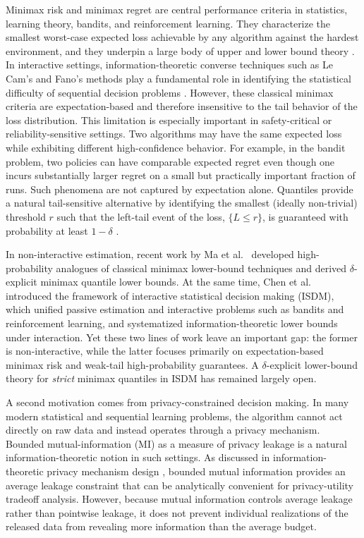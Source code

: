 \documentclass[journal]{IEEEtran}
\begin{document}
Minimax risk and minimax regret are central performance criteria in statistics, learning theory, bandits, and reinforcement learning. They characterize the smallest worst-case expected loss achievable by any algorithm against the hardest environment, and they underpin a large body of upper and lower bound theory \cite{ma2024high,audibert2009minimax,azar2017minimax,jin2018q,lattimore2020bandit,foster2021statistical}. In interactive settings, information-theoretic converse techniques such as Le Cam's and Fano's methods play a fundamental role in identifying the statistical difficulty of sequential decision problems \cite{lecam1973convergence,polyanskiy2014lecture,cover1999elements,yu1997assouad,chen2016bayes,duchi2013distance,chen2024assouad}. However, these classical minimax criteria are expectation-based and therefore insensitive to the tail behavior of the loss distribution. This limitation is especially important in safety-critical or reliability-sensitive settings. Two algorithms may have the same expected loss while exhibiting different high-confidence behavior. For example, in the bandit problem, two policies can have comparable expected regret even though one incurs substantially larger regret on a small but practically important fraction of runs. Such phenomena are not captured by expectation alone. Quantiles provide a natural tail-sensitive alternative by identifying the smallest (ideally non-trivial) threshold $r$ such that the left-tail event of the loss, \(\{L\le r\}\), is guaranteed with probability at least $1-\delta$ \cite{ma2024high}.

In non-interactive estimation, recent work by Ma et al.\ \cite{ma2024high} developed high-probability analogues of classical minimax lower-bound techniques and derived \(\delta\)-explicit minimax quantile lower bounds. At the same time, Chen et al.\ \cite{chen2024assouad} introduced the framework of interactive statistical decision making (ISDM), which unified passive estimation and interactive problems such as bandits and reinforcement learning, and systematized information-theoretic lower bounds under interaction. Yet these two lines of work leave an important gap: the former is non-interactive, while the latter focuses primarily on expectation-based minimax risk and weak-tail high-probability guarantees. A \(\delta\)-explicit lower-bound theory for \emph{strict} minimax quantiles in ISDM has remained largely open.

A second motivation comes from privacy-constrained decision making. In many modern statistical and sequential learning problems, the algorithm cannot act directly on raw data and instead operates through a privacy mechanism. Bounded mutual-information (MI) as a measure of privacy leakage is a natural information-theoretic notion in such settings. As discussed in information-theoretic privacy mechanism design
\cite{zamani2023privacy,zamani2022bounds}, bounded mutual information
provides an average leakage constraint that can be analytically convenient for
privacy-utility tradeoff analysis. However, because mutual information controls
average leakage rather than pointwise leakage, it does not prevent individual
realizations of the released data from revealing more information than the
average budget. 
\end{document}

